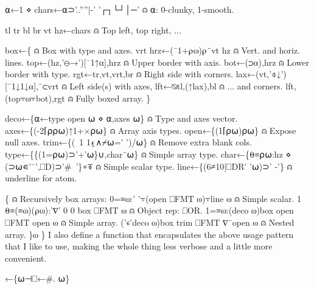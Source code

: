 \documentclass{article}%
\begin{document}
  ⍺←1 ⋄ chars←⍺⊃'..''''|-' '┌┐└┘│─'     ⍝ ⍺: 0-clunky, 1-smooth.
                    
  tl tr bl br vt hz←chars               ⍝ Top left, top right, ...
                    
  box←\{                                 ⍝ Box with type and axes.
    vrt hrz←(¯1+⍴⍵)⍴¨vt hz              ⍝ Vert. and horiz. lines.
    top←(hz,'⊖→')[¯1↑⍺],hrz             ⍝ Upper border with axis.
    bot←(⊃⍺),hrz                        ⍝ Lower border with type.
    rgt←tr,vt,vrt,br                    ⍝ Right side with corners.
    lax←(vt,'⌽↓')[¯1↓1↓⍺],¨⊂vrt         ⍝ Left side(s) with axes,
    lft←⍉tl,(↑lax),bl                   ⍝ ... and corners.
    lft,(top⍪⍵⍪bot),rgt                 ⍝ Fully boxed array.
  \}                                     
                    
  deco←\{⍺←type open ⍵ ⋄ ⍺,axes ⍵\}       ⍝ Type and axes vector.
  axes←\{(-2⌈⍴⍴⍵)↑1+×⍴⍵\}                 ⍝ Array axis types.
  open←\{(1⌈⍴⍵)⍴⍵\}                       ⍝ Expose null axes.
  trim←\{(~1 1⍷∧⌿⍵=' ')/⍵\}               ⍝ Remove extra blank cols.
  type←\{\{(1=⍴⍵)⊃'+'⍵\}∪,char¨⍵\}          ⍝ Simple array type.
  char←\{⍬≡⍴⍵:hz ⋄ (⊃⍵∊'¯',⎕D)⊃'#~'\}∘⍕   ⍝ Simple scalar type.
  line←\{(6≠10|⎕DR' '⍵)⊃' -'\}            ⍝ underline for atom.
                    
  \{                                     ⍝ Recursively box arrays:
    0=≡⍵:' '⍪(open ⎕FMT ⍵)⍪line ⍵       ⍝ Simple scalar.
    1 ⍬≡(≡⍵)(⍴⍵):'∇' 0 0 box ⎕FMT ⍵     ⍝ Object rep: ⎕OR.
    1=≡⍵:(deco ⍵)box open ⎕FMT open ⍵   ⍝ Simple array.
    ('∊'deco ⍵)box trim ⎕FMT ∇¨open ⍵   ⍝ Nested array.
  \}⍵
\}
\eatline
{}\nwendcode{}\nwdocspar
I also define a function {\Tt{}\nwendquote} that encapsulates the above usage 
pattern that I like to use, making the whole thing less verbose and 
a little more convenient.

\nwenddocs{}\endmoddef\nwstartdeflinemarkup\nwenddeflinemarkup
{}←\{⍵⊣⎕←#. ⍵\}
\eatline
{}\nwendcode{}
\end{document}
